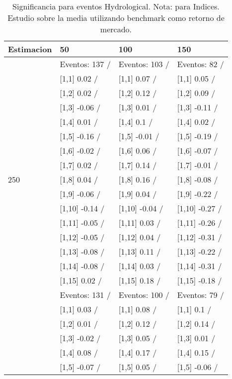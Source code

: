 \begin{table}

\caption{Significancia para eventos Hydrological. Nota: para Indices. Estudio sobre la media utilizando benchmark como retorno de mercado.}
\centering
\begin{tabular}[t]{llll}
\toprule
Estimacion & 50 & 100 & 150\\
\midrule
 & Eventos:  137 / & Eventos:  103 / & Eventos:  82 /\\
 & {}[1,1] 0.02  / & {}[1,1] 0.07  / & {}[1,1] 0.05  /\\
 & {}[1,2] 0.02  / & {}[1,2] 0.12  / & {}[1,2] 0.09  /\\
 & {}[1,3] -0.06  / & {}[1,3] 0.01  / & {}[1,3] -0.11  /\\
 & {}[1,4] 0.01  / & {}[1,4] 0.1  / & {}[1,4] 0.02  /\\
\addlinespace
 & {}[1,5] -0.16  / & {}[1,5] -0.01  / & {}[1,5] -0.19  /\\
 & {}[1,6] -0.02  / & {}[1,6] 0.06  / & {}[1,6] -0.07  /\\
 & {}[1,7] 0.02  / & {}[1,7] 0.14  / & {}[1,7] -0.01  /\\
250 & {}[1,8] 0.04  / & {}[1,8] 0.16  / & {}[1,8] -0.08  /\\
 & {}[1,9] -0.06  / & {}[1,9] 0.04  / & {}[1,9] -0.22  /\\
\addlinespace
 & {}[1,10] -0.14  / & {}[1,10] -0.04  / & {}[1,10] -0.27  /\\
 & {}[1,11] -0.05  / & {}[1,11] 0.03  / & {}[1,11] -0.26  /\\
 & {}[1,12] -0.05  / & {}[1,12] 0.04  / & {}[1,12] -0.31  /\\
 & {}[1,13] -0.08  / & {}[1,13] 0.11  / & {}[1,13] -0.22  /\\
 & {}[1,14] -0.08  / & {}[1,14] 0.03  / & {}[1,14] -0.31  /\\
\addlinespace
 & {}[1,15] 0.02  / & {}[1,15] 0.18  / & {}[1,15] -0.18  /\\
 & Eventos:  131 / & Eventos:  100 / & Eventos:  79 /\\
 & {}[1,1] 0.03  / & {}[1,1] 0.08  / & {}[1,1] 0.1  /\\
 & {}[1,2] 0.01  / & {}[1,2] 0.12  / & {}[1,2] 0.14  /\\
 & {}[1,3] -0.02  / & {}[1,3] 0.05  / & {}[1,3] 0.01  /\\
\addlinespace
 & {}[1,4] 0.08  / & {}[1,4] 0.17  / & {}[1,4] 0.15  /\\
 & {}[1,5] -0.07  / & {}[1,5] 0.05  / & {}[1,5] -0.06  /\\

\end{tabular}
\end{table}
